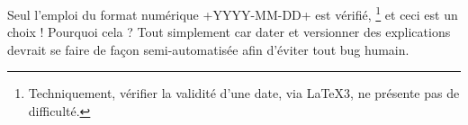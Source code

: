 \documentclass{tutodoc}
\begin{document}
\begin{tdoccaut}
    Seul l'emploi du format numérique \tdoclatexin+YYYY-MM-DD+ est vérifié,%
    \footnote{
        Techniquement, vérifier la validité d'une date, via \LaTeX3, ne présente pas de difficulté.
    }
    et ceci est un choix ! Pourquoi cela ? Tout simplement car dater et versionner des explications devrait se faire de façon semi-automatisée afin d'éviter tout bug humain.
\end{tdoccaut}
\end{document}

